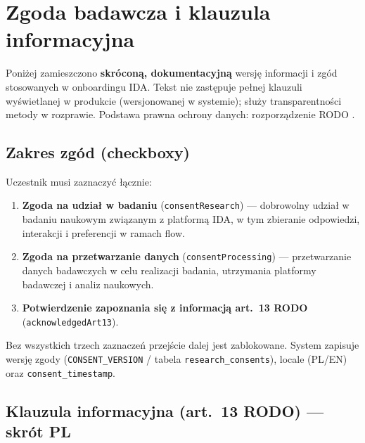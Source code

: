 \chapter{Zgoda badawcza i klauzula informacyjna}
\label{app:f:top}

Poniżej zamieszczono \textbf{skróconą, dokumentacyjną} wersję informacji i zgód stosowanych w onboardingu IDA. Tekst nie zastępuje pełnej klauzuli wyświetlanej w produkcie (wersjonowanej w systemie); służy transparentności metody w rozprawie. Podstawa prawna ochrony danych: rozporządzenie RODO \parencite{eu2016gdpr}.

\section{Zakres zgód (checkboxy)}
\label{app:f:sec:zgody}

Uczestnik musi zaznaczyć łącznie:

\begin{enumerate}
  \item \textbf{Zgoda na udział w badaniu} (\texttt{consentResearch}) --- dobrowolny udział w badaniu naukowym związanym z platformą IDA, w tym zbieranie odpowiedzi, interakcji i preferencji w ramach flow.
  \item \textbf{Zgoda na przetwarzanie danych} (\texttt{consentProcessing}) --- przetwarzanie danych badawczych w celu realizacji badania, utrzymania platformy badawczej i analiz naukowych.
  \item \textbf{Potwierdzenie zapoznania się z informacją art.~13 RODO} (\texttt{acknowledgedArt13}).
\end{enumerate}

Bez wszystkich trzech zaznaczeń przejście dalej jest zablokowane. System zapisuje wersję zgody (\texttt{CONSENT\_VERSION} / tabela \texttt{research\_consents}), locale (PL/EN) oraz \texttt{consent\_timestamp}.

\section{Klauzula informacyjna (art.~13 RODO) --- skrót PL}
\label{app:f:sec:art13-pl}

